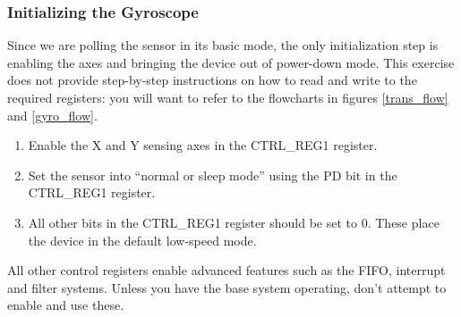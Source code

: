 \documentclass[openany,11pt,fleqn]{book} %
\begin{document}
\begin{exercise}
	\subsubsection{Initializing the Gyroscope}
	Since we are polling the sensor in its basic mode, the only initialization step is enabling the axes and bringing the device out of power-down mode. This exercise does not provide step-by-step instructions on how to read and write to the required registers: you will want to refer to the flowcharts in figures \ref{trans_flow} and \ref{gyro_flow}.
	
	\begin{enumerate}
	    \item Enable the X and Y sensing axes in the CTRL\_REG1 register.
	    \item Set the sensor into ``normal or sleep mode'' using the PD bit in the CTRL\_REG1 register.
	    \item All other bits in the CTRL\_REG1 register should be set to 0. These place the device in the default low-speed mode.
	\end{enumerate} 
\end{exercise}

All other control registers enable advanced features such as the FIFO, interrupt and filter systems. Unless you have the base system operating, don't attempt to enable and use these. 
\end{document}
